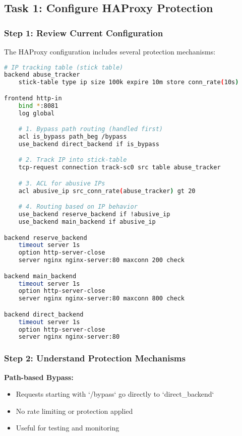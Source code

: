 \documentclass[12pt]{article}
\begin{document}
\subsection{Task 1: Configure HAProxy Protection}

\subsubsection{Step 1: Review Current Configuration}
The HAProxy configuration includes several protection mechanisms:

\begin{lstlisting}[language=bash, caption=HAProxy Configuration]
# IP tracking table (stick table)
backend abuse_tracker
    stick-table type ip size 100k expire 10m store conn_rate(10s)

frontend http-in
    bind *:8081
    log global

    # 1. Bypass path routing (handled first)
    acl is_bypass path_beg /bypass
    use_backend direct_backend if is_bypass

    # 2. Track IP into stick-table
    tcp-request connection track-sc0 src table abuse_tracker

    # 3. ACL for abusive IPs
    acl abusive_ip src_conn_rate(abuse_tracker) gt 20

    # 4. Routing based on IP behavior
    use_backend reserve_backend if !abusive_ip
    use_backend main_backend if abusive_ip

backend reserve_backend
    timeout server 1s
    option http-server-close
    server nginx nginx-server:80 maxconn 200 check

backend main_backend
    timeout server 1s
    option http-server-close
    server nginx nginx-server:80 maxconn 800 check

backend direct_backend
    timeout server 1s
    option http-server-close
    server nginx nginx-server:80
\end{lstlisting}

\subsubsection{Step 2: Understand Protection Mechanisms}

\textbf{Path-based Bypass:}
\begin{itemize}
    \item Requests starting with `/bypass` go directly to `direct_backend`
    \item No rate limiting or protection applied
    \item Useful for testing and monitoring
\end{itemize}
\end{document}
